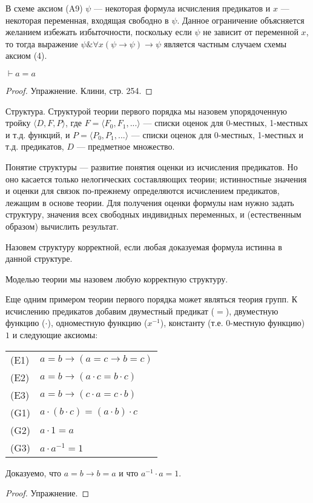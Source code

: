 В схеме аксиом (A9) $\psi$ --- некоторая формула исчисления предикатов и $x$ --- некоторая
переменная, входящая свободно в $\psi$. Данное ограничение объясняется желанием избежать
избыточности, поскольку если $\psi$ не зависит от переменной $x$, то тогда выражение 
$\psi \& \forall{x}(\psi\rightarrow\psi) \rightarrow \psi$ является частным случаем схемы 
аксиом (4).

\begin{theorem}
$\vdash a = a$
\end{theorem}
\begin{proof}
Упражнение. Клини, стр. 254.
\end{proof}

\begin{definition}{Структура.} 
Структурой теории первого порядка мы назовем упорядоченную тройку $\langle{}D, F, P\rangle$,
где $F = \langle{}F_0, F_1, ... \rangle$ --- списки оценок для 0-местных, 1-местных и т.д. функций, 
и $P = \langle{}P_0, P_1, ... \rangle$ --- списки оценок для 0-местных, 1-местных и т.д. предикатов,
$D$ --- предметное множество. 
\end{definition}

Понятие структуры --- развитие понятия оценки из исчисления предикатов. Но оно касается 
только нелогических составляющих теории; истинностные значения и оценки для связок по-прежнему
определяются исчислением предикатов, лежащим в основе теории.
Для получения оценки формулы нам нужно задать структуру, значения всех свободных
индивидных переменных, и (естественным образом) вычислить результат.

\begin{definition}
Назовем структуру корректной, если любая доказуемая формула истинна в данной структуре.
\end{definition}

\begin{definition}Моделью теории мы назовем любую корректную структуру.\end{definition}

Еще одним примером теории первого порядка может являться теория групп.
К исчислению предикатов добавим двуместный предикат ($=$), 
двуместную функцию ($\cdot$), одноместную функцию ($x^{-1}$), константу (т.е. 0-местную функцию) $1$
и следующие аксиомы:

\begin{tabular}{ll}
(E1) & $a = b \rightarrow (a = c \rightarrow b = c)$\\
(E2) & $a = b \rightarrow (a \cdot c = b \cdot c)$\\
(E3) & $a = b \rightarrow (c \cdot a = c \cdot b)$\\
(G1) & $a \cdot (b \cdot c) = (a \cdot b) \cdot c$\\
(G2) & $a \cdot 1 = a$\\
(G3) & $a \cdot a ^ {-1} = 1$
\end{tabular}

\begin{theorem}Доказуемо, что $a=b \rightarrow b=a$ и что $a^{-1} \cdot a = 1$.
\end{theorem}
\begin{proof} Упражнение. \end{proof}

